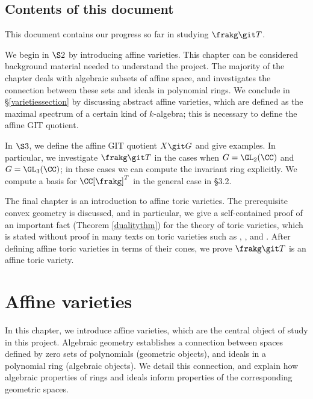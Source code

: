 \documentclass[12pt]{amsart}
\theoremstyle{plain}
\begin{document}
\subsection{Contents of this document}
This document contains our progress so far in studying $\frakg \git T$.

We begin in $\S 2$ by introducing affine varieties.
This chapter can be considered background material needed to understand the project.
The majority of the chapter deals with algebraic subsets of affine space, and investigates the connection between these sets and ideals in polynomial rings.
We conclude in \S \ref{varietiessection} by discussing abstract affine varieties, which are defined as the maximal spectrum of a certain kind of $k$-algebra;
this is necessary to define the affine GIT quotient.

In $\S 3$, we define the affine GIT quotient $X \git G$ and give examples.
In particular, we investigate $\frakg \git T$ in the cases when $G = \GL_2(\CC)$ and $G = \GL_3(\CC)$; in these cases we can compute the invariant ring explicitly.
We compute a basis for $\CC[\frakg]^T$ in the general case in \S 3.2.

The final chapter is an introduction to affine toric varieties.
The prerequisite convex geometry is discussed, and in particular, we give a self-contained proof of an important fact (Theorem \ref{dualitythm}) for the theory of toric varieties, which is stated without proof in many texts on toric varieties such as \cite{Fulton93}, \cite{CLS11}, and \cite{Oda88}.
After defining affine toric varieties in terms of their cones, we prove $\frakg \git T$ is an affine toric variety.



\newpage
\section{Affine varieties}
In this chapter, we introduce affine varieties, which are the central object of study in this project.
Algebraic geometry establishes a connection between spaces defined by zero sets of polynomials (geometric objects), and ideals in a polynomial ring (algebraic objects).
We detail this connection, and explain how algebraic properties of rings and ideals inform properties of the corresponding geometric spaces.
\end{document}

